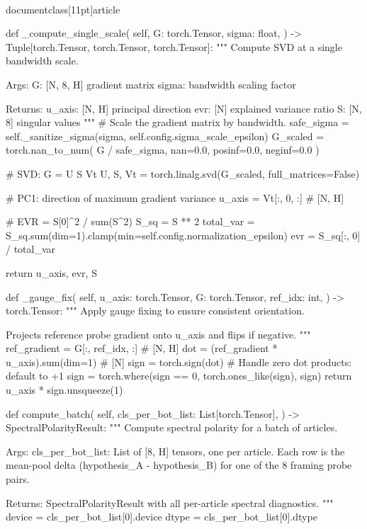 \\documentclass[11pt]{article}
\begin{document}
\begin{CodeBlock}
    def _compute_single_scale(
        self,
        G: torch.Tensor,
        sigma: float,
    ) -> Tuple[torch.Tensor, torch.Tensor, torch.Tensor]:
        """
        Compute SVD at a single bandwidth scale.

        Args:
            G: [N, 8, H] gradient matrix
            sigma: bandwidth scaling factor

        Returns:
            u_axis: [N, H] principal direction
            evr: [N] explained variance ratio
            S: [N, 8] singular values
        """
        # Scale the gradient matrix by bandwidth.
        safe_sigma = self._sanitize_sigma(sigma, self.config.sigma_scale_epsilon)
        G_scaled = torch.nan_to_num(
            G / safe_sigma, nan=0.0, posinf=0.0, neginf=0.0
        )

        # SVD: G = U S Vt
        U, S, Vt = torch.linalg.svd(G_scaled, full_matrices=False)

        # PC1: direction of maximum gradient variance
        u_axis = Vt[:, 0, :]  # [N, H]

        # EVR = S[0]^2 / sum(S^2)
        S_sq = S ** 2
        total_var = S_sq.sum(dim=1).clamp(min=self.config.normalization_epsilon)
        evr = S_sq[:, 0] / total_var

        return u_axis, evr, S

    def _gauge_fix(
        self,
        u_axis: torch.Tensor,
        G: torch.Tensor,
        ref_idx: int,
    ) -> torch.Tensor:
        """
        Apply gauge fixing to ensure consistent orientation.

        Projects reference probe gradient onto u_axis and flips if negative.
        """
        ref_gradient = G[:, ref_idx, :]  # [N, H]
        dot = (ref_gradient * u_axis).sum(dim=1)  # [N]
        sign = torch.sign(dot)
        # Handle zero dot products: default to +1
        sign = torch.where(sign == 0, torch.ones_like(sign), sign)
        return u_axis * sign.unsqueeze(1)

    def compute_batch(
        self,
        cls_per_bot_list: List[torch.Tensor],
    ) -> SpectralPolarityResult:
        """
        Compute spectral polarity for a batch of articles.

        Args:
            cls_per_bot_list: List of [8, H] tensors, one per article.
                Each row is the mean-pool delta (hypothesis_A - hypothesis_B)
                for one of the 8 framing probe pairs.

        Returns:
            SpectralPolarityResult with all per-article spectral diagnostics.
        """
        device = cls_per_bot_list[0].device
        dtype = cls_per_bot_list[0].dtype


\end{CodeBlock}
\end{document}

